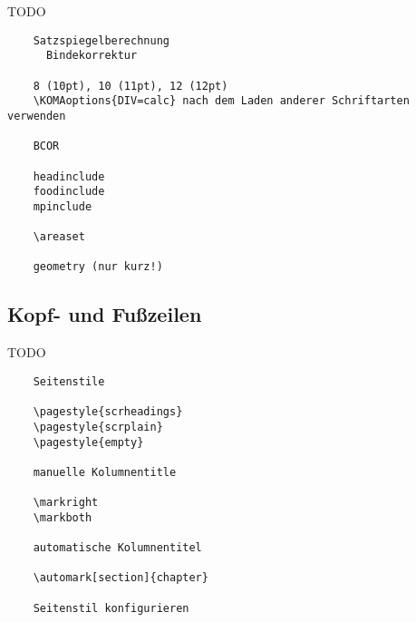 \begin{Frame}[fragile]{TODO}
  \begin{verbatim}
    Satzspiegelberechnung
      Bindekorrektur
    
    8 (10pt), 10 (11pt), 12 (12pt)
    \KOMAoptions{DIV=calc} nach dem Laden anderer Schriftarten verwenden
    
    BCOR
    
    headinclude
    foodinclude
    mpinclude
    
    \areaset
    
    geometry (nur kurz!)
  \end{verbatim}
\end{Frame}

\subsection{Kopf- und Fußzeilen}

\begin{Frame}[fragile]{TODO}
  \begin{verbatim}
    Seitenstile
    
    \pagestyle{scrheadings}
    \pagestyle{scrplain}
    \pagestyle{empty}
    
    manuelle Kolumnentitle
    
    \markright
    \markboth
    
    automatische Kolumnentitel
    
    \automark[section]{chapter}
    
    Seitenstil konfigurieren
  \end{verbatim}
\end{Frame}

